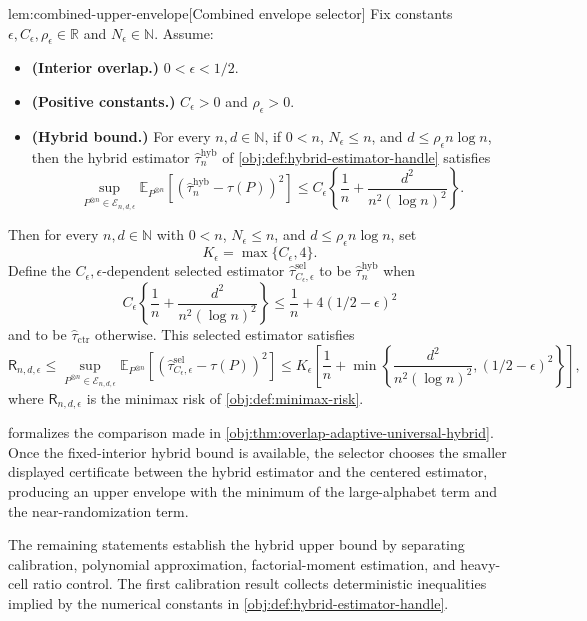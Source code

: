 \begin{lemmav}{lem:combined-upper-envelope}[Combined envelope selector]
Fix constants \(\epsilon,C_\epsilon,\rho_\epsilon\in\mathbb R\) and \(N_\epsilon\in\mathbb N\). Assume:
\begin{itemize}
\item \textbf{(Interior overlap.)} \(0<\epsilon<1/2\).
\item \textbf{(Positive constants.)} \(C_\epsilon>0\) and \(\rho_\epsilon>0\).
\item \textbf{(Hybrid bound.)} For every \(n,d\in\mathbb N\), if \(0<n\), \(N_\epsilon\le n\), and \(d\le \rho_\epsilon n\log n\), then the hybrid estimator \(\widehat\tau_n^{\mathrm{hyb}}\) of \cref{obj:def:hybrid-estimator-handle} satisfies
\[
\sup_{P^{\otimes n}\in\mathcal E_{n,d,\epsilon}}
\mathbb E_{P^{\otimes n}}\!\left[\left(\widehat\tau_n^{\mathrm{hyb}}-\tau(P)\right)^2\right]
\le
C_\epsilon\left\{\frac1n+\frac{d^2}{n^2(\log n)^2}\right\}.
\]
\end{itemize}
Then for every \(n,d\in\mathbb N\) with \(0<n\), \(N_\epsilon\le n\), and \(d\le \rho_\epsilon n\log n\), set
\[
K_\epsilon=\max\{C_\epsilon,4\}.
\]
Define the \(C_\epsilon,\epsilon\)-dependent selected estimator \(\widehat\tau^{\mathrm{sel}}_{C_\epsilon,\epsilon}\) to be \(\widehat\tau_n^{\mathrm{hyb}}\) when
\[
C_\epsilon\left\{\frac1n+\frac{d^2}{n^2(\log n)^2}\right\}
\le
\frac1n+4(1/2-\epsilon)^2
\]
and to be \(\widehat\tau_{\mathrm{ctr}}\) otherwise. This selected estimator satisfies
\[
\mathsf R_{n,d,\epsilon}\le
\sup_{P^{\otimes n}\in\mathcal E_{n,d,\epsilon}}
\mathbb E_{P^{\otimes n}}\!\left[\left(\widehat\tau^{\mathrm{sel}}_{C_\epsilon,\epsilon}-\tau(P)\right)^2\right]
\le
K_\epsilon\left[
\frac1n+
\min\left\{\frac{d^2}{n^2(\log n)^2},(1/2-\epsilon)^2\right\}
\right],
\]
where \(\mathsf R_{n,d,\epsilon}\) is the minimax risk of \cref{obj:def:minimax-risk}.
\end{lemmav}

 formalizes the comparison made in \cref{obj:thm:overlap-adaptive-universal-hybrid}. Once the fixed-interior hybrid bound is available, the selector chooses the smaller displayed certificate between the hybrid estimator and the centered estimator, producing an upper envelope with the minimum of the large-alphabet term and the near-randomization term.

The remaining statements establish the hybrid upper bound by separating calibration, polynomial approximation, factorial-moment estimation, and heavy-cell ratio control. The first calibration result collects deterministic inequalities implied by the numerical constants in \cref{obj:def:hybrid-estimator-handle}.

